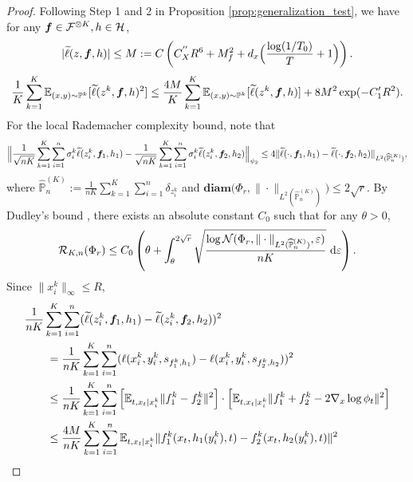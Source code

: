 \documentclass[11pt]{article}
\numberwithin{equation}{section}
\renewcommand{\P}{\mathbb{P}}
\begin{document}
\begin{proof}
    Following Step 1 and 2 in Proposition \ref{prop:generalization_test}, we have for any ${\bm{f}}\in\mathcal{F}^{\otimes K},h\in\mathcal{H}$,
    \begin{equation}
        |\widetilde{\ell}(z,{\bm{f}},h)|\leq M:=C\left(C_X^{''}R^6+M_f^2+d_x\Big(\frac{\log(1/T_0)}{T}+1\Big)\right).
    \end{equation}
    \begin{equation}
        \frac{1}{K}\sum_{k=1}^K\E_{(x,y)\sim\P^k} [\widetilde{\ell}(z^k,\vf,h)^2] \leq \frac{4M}{K}\sum_{k=1}^K\E_{(x,y)\sim\P^k} [\widetilde{\ell}(z^k,\vf,h)] + 8M^2\exp(-C_1'R^2).
    \end{equation}
    For the local Rademacher complexity bound, note that
    \begin{equation}
        \Big\|\frac{1}{\sqrt{nK}} \sum_{k=1}^K\sum_{i=1}^n\sigma_i^k\widetilde{\ell}(z_i^k,\vf_1,h_1) - \frac{1}{\sqrt{nK}} \sum_{k=1}^K\sum_{i=1}^n\sigma_i^k\widetilde{\ell}(z_i^k,\vf_2,h_2) \Big\|_{\psi_2} \leq 4\|\widetilde{\ell}(\cdot,\vf_1,h_1)-\widetilde{\ell}(\cdot,\vf_2,h_2)\|_{L^2(\widehat{\P}_n^{(K)})},
    \end{equation}
    where $\widehat{\P}_n^{(K)}:=\frac{1}{nK}\sum_{k=1}^K\sum_{i=1}^n\delta_{z_i^k}$ and $\textbf{diam}\big(\Phi_r,\|\cdot\|_{L^2(\widehat{\P}_n^{(K)})}\big)\leq 2\sqrt{r}$.
    By Dudley's bound \citep{van2014probability,wainwright2019high}, there exists an absolute constant $C_0$ such that for any $\theta>0$,
    \begin{equation}\label{eq:rademacher_bound_meta_2}
        \mathcal{R}_{K,n}(\Phi_r)\leq C_0\left(\theta+\int_\theta^{2\sqrt{r}}\sqrt{\frac{\log\mathcal{N}(\Phi_r,\|\cdot\|_{L^2(\widehat{\P}_n^{(K)})},\varepsilon)}{nK}}\ \dif\varepsilon\right).
    \end{equation}
    Since $\|x_i^k\|_\infty\leq R$,
    \begin{equation}
        \begin{aligned}
            &\frac{1}{nK}\sum_{k=1}^K\sum_{i=1}^n(\widetilde{\ell}(z_i^k,\vf_1,h_1)-\widetilde{\ell}(z_i^k,\vf_2,h_2))^2 \\
            &\qquad= \frac{1}{nK}\sum_{k=1}^K\sum_{i=1}^n(\ell(x_i^k,y_i^k,s_{f_1^k,h_1})-\ell(x_i^k,y_i^k,s_{f_2^k,h_2}))^2 \\
            &\qquad\leq \frac{1}{nK}\sum_{k=1}^K\sum_{i=1}^n \left[\E_{t,x_t|x_i^k}\|f_1^k-f_2^k\|^2\right]\cdot\left[\E_{t,x_t|x_i^k}\|f_1^k+f_2^k-2\nabla_x\log\phi_t\|^2\right] \\
            &\qquad\leq \frac{4M}{nK}\sum_{k=1}^K\sum_{i=1}^n \E_{t,x_t|x_i^k}\|f_1^k(x_t,h_1(y_i^k),t)-f_2^k(x_t,h_2(y_i^k),t)\|^2 \\

\end{aligned}
\end{equation}
\end{proof}
\end{document}
